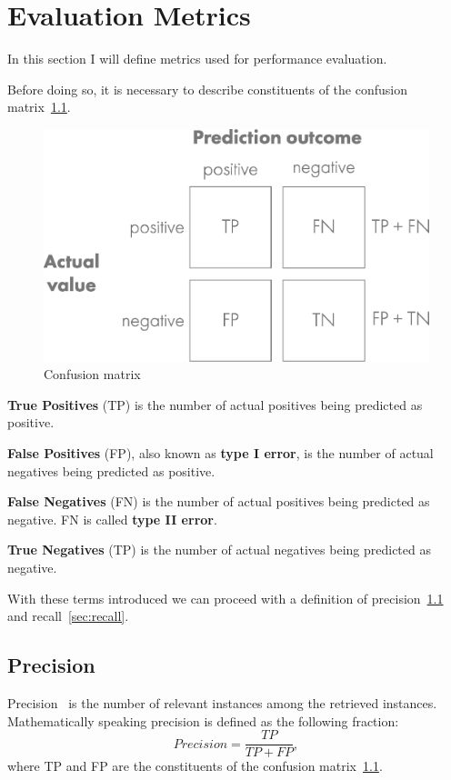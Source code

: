 \chapter{Evaluation Metrics}\label{ch:evaluation-metrics}
In this section I will define metrics used for performance evaluation.

Before doing so, it is necessary to describe constituents of the confusion matrix~\ref{fig:confusionmat}.

\begin{figure}[H]
    \centering
    \includegraphics[width=0.9\columnwidth]{images/implementation/confusion_matrix.eps}
    \caption{Confusion matrix~\cite{ConfMat}}
    \label{fig:confusionmat}
\end{figure}

\textbf{True Positives} (TP) is the number of actual positives being predicted as positive.

\textbf{False Positives} (FP), also known as \textbf{type I error}, is the number of actual negatives being predicted
as positive.

\textbf{False Negatives} (FN) is the number of actual positives being predicted as negative.
FN is called \textbf{type II error}.

\textbf{True Negatives} (TP) is the number of actual negatives being predicted as negative.

With these terms introduced we can proceed with a definition of precision~\ref{sec:precision} and
recall~\ref{sec:recall}.

\section{Precision}\label{sec:precision}
Precision~\cite{PreRec} is the number of relevant instances among the retrieved instances.
Mathematically speaking precision is defined as the following fraction:
\begin{equation}
    Precision = \frac{TP}{TP + FP},
\end{equation}
where TP and FP are the constituents of the confusion matrix~\ref{fig:confusionmat}.

